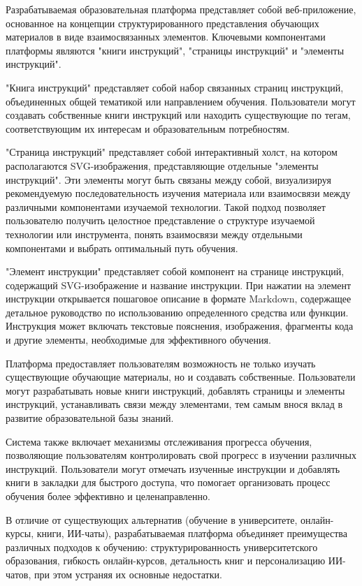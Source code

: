 {\gostFont

  \par \redline Разрабатываемая образовательная платформа представляет собой веб-приложение, основанное на концепции структурированного представления обучающих материалов в виде взаимосвязанных элементов. Ключевыми компонентами платформы являются "книги инструкций", "страницы инструкций" и "элементы инструкций".

  \par \redline "Книга инструкций" представляет собой набор связанных страниц инструкций, объединенных общей тематикой или направлением обучения. Пользователи могут создавать собственные книги инструкций или находить существующие по тегам, соответствующим их интересам и образовательным потребностям.

  \par \redline "Страница инструкций" представляет собой интерактивный холст, на котором располагаются SVG-изображения, представляющие отдельные "элементы инструкций". Эти элементы могут быть связаны между собой, визуализируя рекомендуемую последовательность изучения материала или взаимосвязи между различными компонентами изучаемой технологии. Такой подход позволяет пользователю получить целостное представление о структуре изучаемой технологии или инструмента, понять взаимосвязи между отдельными компонентами и выбрать оптимальный путь обучения.

  \par \redline "Элемент инструкции" представляет собой компонент на странице инструкций, содержащий SVG-изображение и название инструкции. При нажатии на элемент инструкции открывается пошаговое описание в формате Markdown, содержащее детальное руководство по использованию определенного средства или функции. Инструкция может включать текстовые пояснения, изображения, фрагменты кода и другие элементы, необходимые для эффективного обучения.

  \par \redline Платформа предоставляет пользователям возможность не только изучать существующие обучающие материалы, но и создавать собственные. Пользователи могут разрабатывать новые книги инструкций, добавлять страницы и элементы инструкций, устанавливать связи между элементами, тем самым внося вклад в развитие образовательной базы знаний.

  \par \redline Система также включает механизмы отслеживания прогресса обучения, позволяющие пользователям контролировать свой прогресс в изучении различных инструкций. Пользователи могут отмечать изученные инструкции и добавлять книги в закладки для быстрого доступа, что помогает организовать процесс обучения более эффективно и целенаправленно.

  \par \redline В отличие от существующих альтернатив (обучение в университете, онлайн-курсы, книги, ИИ-чаты), разрабатываемая платформа объединяет преимущества различных подходов к обучению: структурированность университетского образования, гибкость онлайн-курсов, детальность книг и персонализацию ИИ-чатов, при этом устраняя их основные недостатки.

  \par
}

